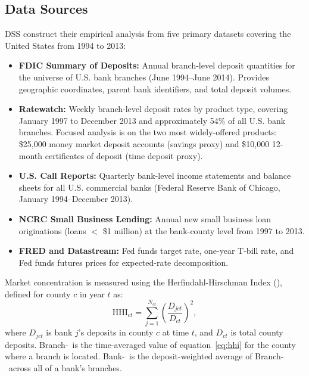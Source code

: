 \documentclass[12pt,a4paper]{article}
\newcommand{\HHI}{\text{HHI}}
\begin{document}
\subsection{Data Sources}

DSS construct their empirical analysis from five primary datasets covering the
United States from 1994 to 2013:

\begin{itemize}
  \item \textbf{FDIC Summary of Deposits:} Annual branch-level deposit
    quantities for the universe of U.S. bank branches (June 1994--June 2014).
    Provides geographic coordinates, parent bank identifiers, and total deposit
    volumes.

  \item \textbf{Ratewatch:} Weekly branch-level deposit rates by product type,
    covering January 1997 to December 2013 and approximately 54\% of all U.S.
    bank branches. Focused analysis is on the two most widely-offered products:
    \$25,000 money market deposit accounts (savings proxy) and \$10,000
    12-month certificates of deposit (time deposit proxy).

  \item \textbf{U.S. Call Reports:} Quarterly bank-level income statements and
    balance sheets for all U.S. commercial banks (Federal Reserve Bank of
    Chicago, January 1994--December 2013).

  \item \textbf{NCRC Small Business Lending:} Annual new small business loan
    originations (loans $<$ \$1 million) at the bank-county level from 1997 to
    2013.

  \item \textbf{FRED and Datastream:} Fed funds target rate, one-year T-bill
    rate, and Fed funds futures prices for expected-rate decomposition.
\end{itemize}

Market concentration is measured using the Herfindahl-Hirschman Index
(\HHI), defined for county $c$ in year $t$ as:
\begin{equation}
  \HHI_{ct} = \sum_{j=1}^{N_{ct}} \left( \frac{D_{jct}}{D_{ct}} \right)^2,
  \label{eq:hhi}
\end{equation}
where $D_{jct}$ is bank $j$'s deposits in county $c$ at time $t$, and
$D_{ct}$ is total county deposits. Branch-\HHI\ is the time-averaged value
of equation~\eqref{eq:hhi} for the county where a branch is located.
Bank-\HHI\ is the deposit-weighted average of Branch-\HHI\ across all of a
bank's branches.
\end{document}
